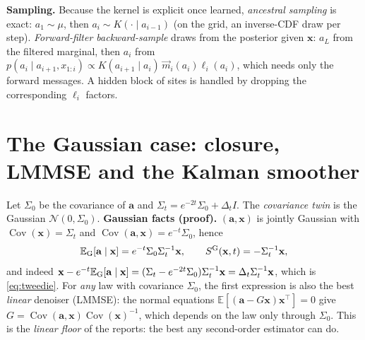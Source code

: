 \textbf{Sampling.} Because the kernel is explicit once learned, \emph{ancestral sampling} is exact: $a_1\sim\mu$, then $a_i\sim K(\cdot\mid a_{i-1})$ (on the grid, an inverse-CDF draw per step). \emph{Forward-filter backward-sample} draws
from the posterior given $\mathbf x$: $a_L$ from the filtered marginal, then $a_i$ from $p(a_i\mid a_{i+1},x_{1:i})\propto K(a_{i+1}\mid a_i)\,\overrightarrow m_i(a_i)\ell_i(a_i)$, which needs only the forward messages.
A hidden block of sites is handled by dropping the corresponding $\ell_i$ factors.

\section{The Gaussian case: closure, LMMSE and the Kalman smoother}

Let $\Sigma_0$ be the covariance of $\mathbf a$ and $\Sigma_t=e^{-2t}\Sigma_0+\Delta_tI$. The \emph{covariance twin} is the Gaussian $\mathcal N(0,\Sigma_0)$.
\textbf{Gaussian facts (proof).} $(\mathbf a,\mathbf x)$ is jointly Gaussian with $\operatorname{Cov}(\mathbf x)=\Sigma_t$ and $\operatorname{Cov}(\mathbf a,\mathbf x)=e^{-t}\Sigma_0$, hence
\begin{equation}\label{eq:gaussscore}
\mathbb E_{\rm G}[\mathbf a\mid\mathbf x]=e^{-t}\Sigma_0\Sigma_t^{-1}\mathbf x,\qquad S^{\rm G}(\mathbf x,t)=-\Sigma_t^{-1}\mathbf x,
\end{equation}
and indeed $\mathbf x-e^{-t}\mathbb E_{\rm G}[\mathbf a\mid\mathbf x]=(\Sigma_t-e^{-2t}\Sigma_0)\Sigma_t^{-1}\mathbf x=\Delta_t\Sigma_t^{-1}\mathbf x$, which is \eqref{eq:tweedie}. For \emph{any} law with covariance $\Sigma_0$, the first expression is
also the best \emph{linear} denoiser (LMMSE): the normal equations $\mathbb E[(\mathbf a-G\mathbf x)\mathbf x^{\top}]=0$ give $G=\operatorname{Cov}(\mathbf a,\mathbf x)\operatorname{Cov}(\mathbf x)^{-1}$, which depends on the law only through $\Sigma_0$.
This is the \emph{linear floor} of the reports: the best any second-order estimator can do.

